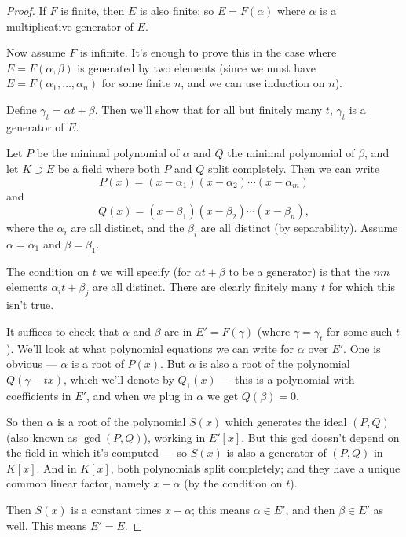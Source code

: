 \begin{proof}
    If $F$ is finite, then $E$ is also finite; so $E = F(\alpha)$ where $\alpha$ is a multiplicative generator of $E$. 
    
    Now assume $F$ is infinite. It's enough to prove this in the case where $E = F(\alpha, \beta)$ is generated by two elements (since we must have $E = F(\alpha_1, \ldots, \alpha_n)$ for some finite $n$, and we can use induction on $n$). 
    
    Define $\gamma_t = \alpha t + \beta$. Then we'll show that for all but finitely many $t$, $\gamma_t$ is a generator of $E$. 
    
    Let $P$ be the minimal polynomial of $\alpha$ and $Q$ the minimal polynomial of $\beta$, and let $K \supset E$ be a field where both $P$ and $Q$ split completely. Then we can write \[P(x) = (x - \alpha_1)(x - \alpha_2)\cdots (x - \alpha_m)\] and \[Q(x) = (x - \beta_1)(x - \beta_2)\cdots (x - \beta_n),\] where the $\alpha_i$ are all distinct, and the $\beta_i$ are all distinct (by separability). Assume $\alpha = \alpha_1$ and $\beta = \beta_1$. 
    
    The condition on $t$ we will specify (for $\alpha t + \beta$ to be a generator) is that the $nm$ elements $\alpha_i t + \beta_j$ are all distinct. There are clearly finitely many $t$ for which this isn't true. 
    
    It suffices to check that $\alpha$ and $\beta$ are in $E' = F(\gamma)$ (where $\gamma = \gamma_t$ for some such $t$). We'll look at what polynomial equations we can write for $\alpha$ over $E'$. One is obvious --- $\alpha$ is a root of $P(x)$. But $\alpha$ is also a root of the polynomial $Q(\gamma - tx)$, which we'll denote by $Q_1(x)$ --- this is a polynomial with coefficients in $E'$, and when we plug in $\alpha$ we get $Q(\beta) = 0$. 
    
    So then $\alpha$ is a root of the polynomial $S(x)$ which generates the ideal $(P, Q)$ (also known as $\gcd(P, Q)$), working in $E'[x]$. But this gcd doesn't depend on the field in which it's computed --- so $S(x)$ is also a generator of $(P, Q)$ in $K[x]$. And in $K[x]$, both polynomials split completely; and they have a unique common linear factor, namely $x - \alpha$ (by the condition on $t$). 
    
    Then $S(x)$ is a constant times $x - \alpha$; this means $\alpha \in E'$, and then $\beta \in E'$ as well. This means $E' = E$. 
\end{proof}

